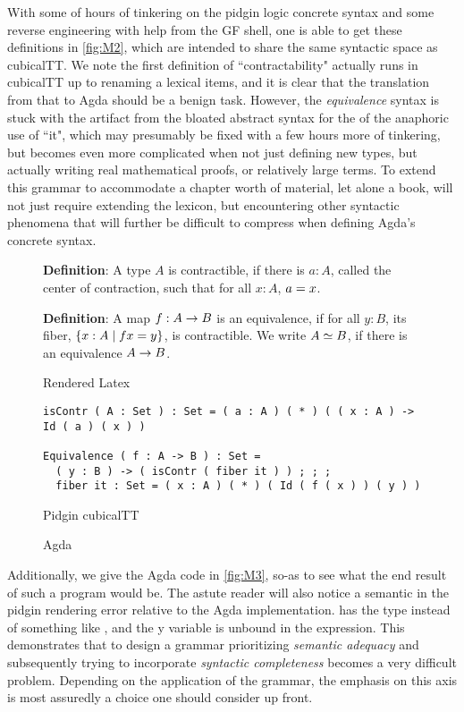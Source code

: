 With some of hours of tinkering on the pidgin logic concrete syntax and some
reverse engineering with help from the GF shell, one is able to get these
definitions in \autoref{fig:M2}, which are intended to share the same syntactic
space as cubicalTT. We note the first definition of ``contractability" actually
runs in cubicalTT up to renaming a lexical items, and it is clear that the
translation from that to Agda should be a benign task. However, the
\emph{equivalence} syntax is stuck with the artifact from the bloated abstract
syntax for the of the anaphoric use of ``it", which may presumably be fixed with
a few hours more of tinkering, but becomes even more complicated when not just
defining new types, but actually writing real mathematical proofs, or relatively
large terms. To extend this grammar to accommodate a chapter worth of material,
let alone a book, will not just require extending the lexicon, but encountering
other syntactic phenomena that will further be difficult to compress when
defining Agda's concrete syntax.

\begin{figure}

 \textbf{Definition}:
 A type $A$ is contractible, if there is $a : A$, called the center of contraction, such that for all $x : A$, $a = x$.

 \textbf{Definition}:
 A map $f : A \rightarrow B$ is an equivalence, if for all $y : B$, its fiber, $\{ x : A \mid f x = y \}$, is contractible.
 We write $A \simeq B$, if there is an equivalence $A \rightarrow B$.
\caption{Rendered Latex} \label{fig:M1}


\begin{verbatim}
isContr ( A : Set ) : Set = ( a : A ) ( * ) ( ( x : A ) -> Id ( a ) ( x ) )

Equivalence ( f : A -> B ) : Set = 
  ( y : B ) -> ( isContr ( fiber it ) ) ; ; ; 
  fiber it : Set = ( x : A ) ( * ) ( Id ( f ( x ) ) ( y ) )
\end{verbatim}
\caption{Pidgin cubicalTT} \label{fig:M2}


% 
% 

\caption{Agda} \label{fig:M3}
\end{figure}

Additionally, we give the Agda code in \autoref{fig:M3}, so-as to see what the
end result of such a program would be. The astute reader will also notice a
semantic in the pidgin rendering error relative to the Agda implementation.
 has the type  instead of something like
, and the y variable is unbound in the 
expression. This demonstrates that to design a grammar prioritizing
\emph{semantic adequacy} and subsequently trying to incorporate \emph{syntactic
completeness} becomes a very difficult problem. Depending on the application of
the grammar, the emphasis on this axis is most assuredly a choice one should
consider up front.

